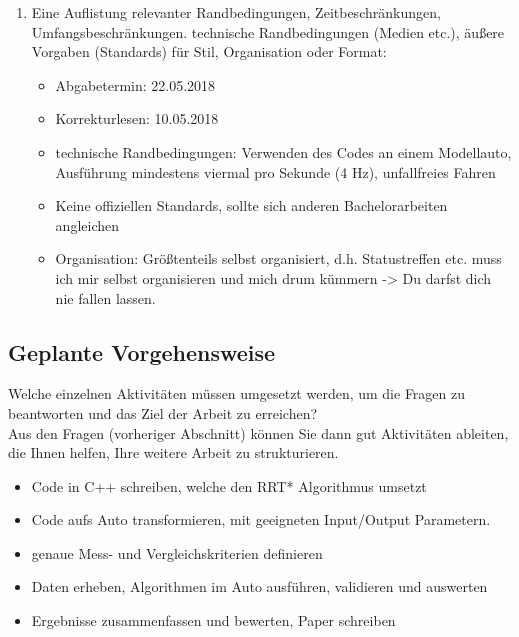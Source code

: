 \documentclass[pdftex,a4paper,12pt]{scrartcl}
\begin{document}
\begin{enumerate}
		\item Eine Auflistung relevanter Randbedingungen, Zeitbeschränkungen, Umfangsbeschränkungen. technische Randbedingungen (Medien etc.), äußere Vorgaben (Standards) für Stil, Organisation oder Format:\\
		\begin{itemize}
		\item Abgabetermin: 22.05.2018
		\item Korrekturlesen: 10.05.2018
		\item technische Randbedingungen: Verwenden des Codes an einem Modellauto, Ausführung mindestens viermal pro Sekunde (4 Hz), unfallfreies Fahren
		\item Keine offiziellen Standards, sollte sich anderen Bachelorarbeiten angleichen
		\item Organisation: Größtenteils selbst organisiert, d.h. Statustreffen etc. muss ich mir selbst organisieren und mich drum kümmern -> Du darfst dich nie fallen lassen.		
		\end{itemize}
	\end{enumerate}

\subsection{Geplante Vorgehensweise}
Welche einzelnen Aktivitäten müssen umgesetzt werden, um die Fragen zu beantworten und das Ziel der Arbeit zu erreichen? \\
Aus den Fragen (vorheriger Abschnitt) können Sie dann gut Aktivitäten ableiten, die Ihnen helfen, Ihre weitere Arbeit zu strukturieren.
\begin{itemize}
	\item Code in C++ schreiben, welche den RRT* Algorithmus umsetzt
	\item Code aufs Auto transformieren, mit geeigneten Input/Output Parametern.
	\item genaue Mess- und Vergleichskriterien definieren
	\item Daten erheben, Algorithmen im Auto ausführen, validieren und auswerten
	\item Ergebnisse zusammenfassen und bewerten, Paper schreiben
\end{itemize}
\end{document}
